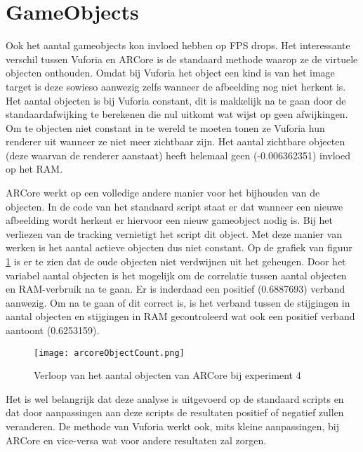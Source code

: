\section{GameObjects}\label{sec:gameobjects}
Ook het aantal gameobjects kon invloed hebben op FPS drops. Het interessante verschil tussen Vuforia en ARCore is de standaard methode waarop ze de virtuele objecten onthouden. Omdat bij Vuforia het object een kind is van het image target is deze sowieso aanwezig zelfs wanneer de afbeelding nog niet herkent is. Het aantal objecten is bij Vuforia constant, dit is makkelijk na te gaan door de standaardafwijking te berekenen die nul uitkomt wat wijst op geen afwijkingen. Om te objecten niet constant in te wereld te moeten tonen ze Vuforia hun renderer uit wanneer ze niet meer zichtbaar zijn. Het aantal zichtbare objecten (deze waarvan de renderer aanstaat) heeft helemaal geen (-0.006362351) invloed op het RAM.

ARCore werkt op een volledige andere manier voor het bijhouden van de objecten. In de code van het standaard script staat er dat wanneer een nieuwe afbeelding wordt herkent er hiervoor een nieuw gameobject nodig is. Bij het verliezen van de tracking vernietigt het script dit object. Met deze manier van werken is het aantal actieve objecten dus niet constant. Op de grafiek van figuur \ref{fig:arcoreObjectCount} is er te zien dat de oude objecten niet verdwijnen uit het geheugen. Door het variabel aantal objecten is het mogelijk om de correlatie tussen aantal objecten en RAM-verbruik na te gaan. Er is inderdaad een positief (0.6887693) verband aanwezig. Om na te gaan of dit correct is, is het verband tussen de stijgingen in aantal objecten en stijgingen in RAM gecontroleerd wat ook een positief verband aantoont (0.6253159). 

\begin{figure}
    \texttt{[image: arcoreObjectCount.png]}
    \caption{Verloop van het aantal objecten van ARCore bij experiment 4}
    \label{fig:arcoreObjectCount}
\end{figure}

Het is wel belangrijk dat deze analyse is uitgevoerd op de standaard scripts en dat door aanpassingen aan deze scripts de resultaten positief of negatief zullen veranderen. De methode van Vuforia werkt ook, mits kleine aanpassingen, bij ARCore en vice-versa wat voor andere resultaten zal zorgen.

